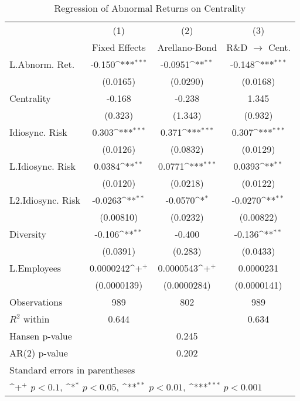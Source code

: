 \begin{table}[htbp]\centering \caption{Regression of Abnormal Returns on Centrality\label{r6}}
{
\def\sym#1{\ifmmode^{#1}\else\(^{#1}\)\fi}
\begin{tabular}{l*{3}{c}}
\hline\hline
                    &\multicolumn{1}{c}{(1)}&\multicolumn{1}{c}{(2)}&\multicolumn{1}{c}{(3)}\\
                    &\multicolumn{1}{c}{Fixed Effects}&\multicolumn{1}{c}{Arellano-Bond}&\multicolumn{1}{c}{R\&D $\rightarrow$ Cent.}\\
\hline
L.Abnorm. Ret.      &      -0.150\sym{***}&     -0.0951\sym{**} &      -0.148\sym{***}\\
                    &    (0.0165)         &    (0.0290)         &    (0.0168)         \\
Centrality          &      -0.168         &      -0.238         &       1.345         \\
                    &     (0.323)         &     (1.343)         &     (0.932)         \\
Idiosync. Risk      &       0.303\sym{***}&       0.371\sym{***}&       0.307\sym{***}\\
                    &    (0.0126)         &    (0.0832)         &    (0.0129)         \\
L.Idiosync. Risk    &      0.0384\sym{**} &      0.0771\sym{***}&      0.0393\sym{**} \\
                    &    (0.0120)         &    (0.0218)         &    (0.0122)         \\
L2.Idiosync. Risk   &     -0.0263\sym{**} &     -0.0570\sym{*}  &     -0.0270\sym{**} \\
                    &   (0.00810)         &    (0.0232)         &   (0.00822)         \\
Diversity           &      -0.106\sym{**} &      -0.400         &      -0.136\sym{**} \\
                    &    (0.0391)         &     (0.283)         &    (0.0433)         \\
L.Employees         &   0.0000242\sym{+}  &   0.0000543\sym{+}  &   0.0000231         \\
                    & (0.0000139)         & (0.0000284)         & (0.0000141)         \\
\hline
Observations        &         989         &         802         &         989         \\
$R^2$ within                &       0.644         &                     &       0.634         \\
Hansen p-value             &                     &       0.245         &                     \\
AR(2) p-value                &                     &       0.202         &                     \\
\hline\hline
\multicolumn{4}{l}{\footnotesize Standard errors in parentheses}\\
\multicolumn{4}{l}{\footnotesize \sym{+} \(p<0.1\), \sym{*} \(p<0.05\), \sym{**} \(p<0.01\), \sym{***} \(p<0.001\)}\\
\end{tabular}
}

\end{table}

